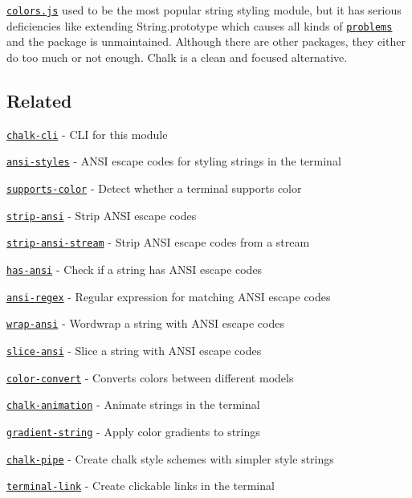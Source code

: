 \href{https://github.com/Marak/colors.js}{\tt colors.\+js} used to be the most popular string styling module, but it has serious deficiencies like extending {\ttfamily String.\+prototype} which causes all kinds of \href{https://github.com/yeoman/yo/issues/68}{\tt problems} and the package is unmaintained. Although there are other packages, they either do too much or not enough. Chalk is a clean and focused alternative.

\subsection*{Related}


\begin{DoxyItemize}
\item \href{https://github.com/chalk/chalk-cli}{\tt chalk-\/cli} -\/ C\+LI for this module
\item \href{https://github.com/chalk/ansi-styles}{\tt ansi-\/styles} -\/ A\+N\+SI escape codes for styling strings in the terminal
\item \href{https://github.com/chalk/supports-color}{\tt supports-\/color} -\/ Detect whether a terminal supports color
\item \href{https://github.com/chalk/strip-ansi}{\tt strip-\/ansi} -\/ Strip A\+N\+SI escape codes
\item \href{https://github.com/chalk/strip-ansi-stream}{\tt strip-\/ansi-\/stream} -\/ Strip A\+N\+SI escape codes from a stream
\item \href{https://github.com/chalk/has-ansi}{\tt has-\/ansi} -\/ Check if a string has A\+N\+SI escape codes
\item \href{https://github.com/chalk/ansi-regex}{\tt ansi-\/regex} -\/ Regular expression for matching A\+N\+SI escape codes
\item \href{https://github.com/chalk/wrap-ansi}{\tt wrap-\/ansi} -\/ Wordwrap a string with A\+N\+SI escape codes
\item \href{https://github.com/chalk/slice-ansi}{\tt slice-\/ansi} -\/ Slice a string with A\+N\+SI escape codes
\item \href{https://github.com/qix-/color-convert}{\tt color-\/convert} -\/ Converts colors between different models
\item \href{https://github.com/bokub/chalk-animation}{\tt chalk-\/animation} -\/ Animate strings in the terminal
\item \href{https://github.com/bokub/gradient-string}{\tt gradient-\/string} -\/ Apply color gradients to strings
\item \href{https://github.com/LitoMore/chalk-pipe}{\tt chalk-\/pipe} -\/ Create chalk style schemes with simpler style strings
\item \href{https://github.com/sindresorhus/terminal-link}{\tt terminal-\/link} -\/ Create clickable links in the terminal
\end{DoxyItemize}

